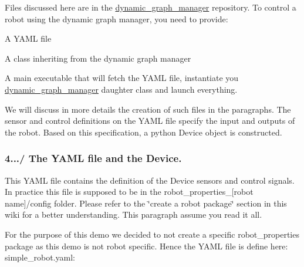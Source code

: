 Files discussed here are in the \hyperlink{namespacedynamic__graph__manager}{dynamic\+\_\+graph\+\_\+manager} repository. To control a robot using the dynamic graph manager, you need to provide\+:
\begin{DoxyItemize}
\item A Y\+A\+ML file
\item A class inheriting from the dynamic graph manager
\item A main executable that will fetch the Y\+A\+ML file, instantiate you \hyperlink{namespacedynamic__graph__manager}{dynamic\+\_\+graph\+\_\+manager} daughter class and launch everything.
\end{DoxyItemize}

We will discuss in more details the creation of such files in the paragraphs. The sensor and control definitions on the Y\+A\+ML file specify the input and outputs of the robot. Based on this specification, a python Device object is constructed.\hypertarget{subsubpage_implement_dgm_dgm_impl_sec_yaml_file}{}\subsubsection{4.../ The Y\+A\+M\+L file and the Device.}\label{subsubpage_implement_dgm_dgm_impl_sec_yaml_file}
This Y\+A\+ML file contains the definition of the Device sensors and control signals. In practice this file is supposed to be in the robot\+\_\+properties\+\_\+\mbox{[}robot name\mbox{]}/config folder. Please refer to the \char`\"{}create a robot
package\char`\"{} section in this wiki for a better understanding. This paragraph assume you read it all.

For the purpose of this demo we decided to not create a specific robot\+\_\+properties package as this demo is not robot specific. Hence the Y\+A\+ML file is define here\+: simple\+\_\+robot.\+yaml\+: 

